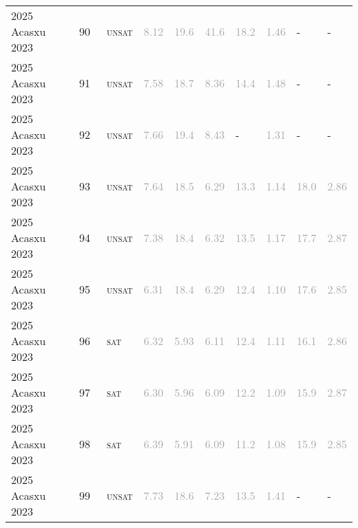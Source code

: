 \begin{center}
{\begin{longtable}{@{}llllllllll@{}}
2025 Acasxu 2023 & 90 & ~\textsc{unsat} & \textcolor{darkgray}{8.12} & \textcolor{darkgray}{19.6} & \textcolor{darkgray}{41.6} & \textcolor{darkgray}{18.2} & \textcolor{darkgray}{1.46} & - & - \\
2025 Acasxu 2023 & 91 & ~\textsc{unsat} & \textcolor{darkgray}{7.58} & \textcolor{darkgray}{18.7} & \textcolor{darkgray}{8.36} & \textcolor{darkgray}{14.4} & \textcolor{darkgray}{1.48} & - & - \\
2025 Acasxu 2023 & 92 & ~\textsc{unsat} & \textcolor{darkgray}{7.66} & \textcolor{darkgray}{19.4} & \textcolor{darkgray}{8.43} & - & \textcolor{darkgray}{1.31} & - & - \\
2025 Acasxu 2023 & 93 & ~\textsc{unsat} & \textcolor{darkgray}{7.64} & \textcolor{darkgray}{18.5} & \textcolor{darkgray}{6.29} & \textcolor{darkgray}{13.3} & \textcolor{darkgray}{1.14} & \textcolor{darkgray}{18.0} & \textcolor{darkgray}{2.86} \\
2025 Acasxu 2023 & 94 & ~\textsc{unsat} & \textcolor{darkgray}{7.38} & \textcolor{darkgray}{18.4} & \textcolor{darkgray}{6.32} & \textcolor{darkgray}{13.5} & \textcolor{darkgray}{1.17} & \textcolor{darkgray}{17.7} & \textcolor{darkgray}{2.87} \\
2025 Acasxu 2023 & 95 & ~\textsc{unsat} & \textcolor{darkgray}{6.31} & \textcolor{darkgray}{18.4} & \textcolor{darkgray}{6.29} & \textcolor{darkgray}{12.4} & \textcolor{darkgray}{1.10} & \textcolor{darkgray}{17.6} & \textcolor{darkgray}{2.85} \\
2025 Acasxu 2023 & 96 & ~\textsc{sat} & \textcolor{darkgray}{6.32} & \textcolor{darkgray}{5.93} & \textcolor{darkgray}{6.11} & \textcolor{darkgray}{12.4} & \textcolor{darkgray}{1.11} & \textcolor{darkgray}{16.1} & \textcolor{darkgray}{2.86} \\
2025 Acasxu 2023 & 97 & ~\textsc{sat} & \textcolor{darkgray}{6.30} & \textcolor{darkgray}{5.96} & \textcolor{darkgray}{6.09} & \textcolor{darkgray}{12.2} & \textcolor{darkgray}{1.09} & \textcolor{darkgray}{15.9} & \textcolor{darkgray}{2.87} \\
2025 Acasxu 2023 & 98 & ~\textsc{sat} & \textcolor{darkgray}{6.39} & \textcolor{darkgray}{5.91} & \textcolor{darkgray}{6.09} & \textcolor{darkgray}{11.2} & \textcolor{darkgray}{1.08} & \textcolor{darkgray}{15.9} & \textcolor{darkgray}{2.85} \\
2025 Acasxu 2023 & 99 & ~\textsc{unsat} & \textcolor{darkgray}{7.73} & \textcolor{darkgray}{18.6} & \textcolor{darkgray}{7.23} & \textcolor{darkgray}{13.5} & \textcolor{darkgray}{1.41} & - & - \\

\end{longtable}}
\end{center}
